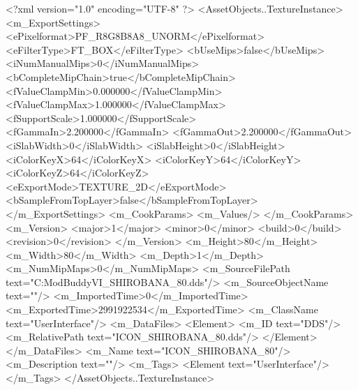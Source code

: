 <?xml version="1.0" encoding="UTF-8" ?>
<AssetObjects..TextureInstance>
	<m_ExportSettings>
		<ePixelformat>PF_R8G8B8A8_UNORM</ePixelformat>
		<eFilterType>FT_BOX</eFilterType>
		<bUseMips>false</bUseMips>
		<iNumManualMips>0</iNumManualMips>
		<bCompleteMipChain>true</bCompleteMipChain>
		<fValueClampMin>0.000000</fValueClampMin>
		<fValueClampMax>1.000000</fValueClampMax>
		<fSupportScale>1.000000</fSupportScale>
		<fGammaIn>2.200000</fGammaIn>
		<fGammaOut>2.200000</fGammaOut>
		<iSlabWidth>0</iSlabWidth>
		<iSlabHeight>0</iSlabHeight>
		<iColorKeyX>64</iColorKeyX>
		<iColorKeyY>64</iColorKeyY>
		<iColorKeyZ>64</iColorKeyZ>
		<eExportMode>TEXTURE_2D</eExportMode>
		<bSampleFromTopLayer>false</bSampleFromTopLayer>
	</m_ExportSettings>
	<m_CookParams>
		<m_Values/>
	</m_CookParams>
	<m_Version>
		<major>1</major>
		<minor>0</minor>
		<build>0</build>
		<revision>0</revision>
	</m_Version>
	<m_Height>80</m_Height>
	<m_Width>80</m_Width>
	<m_Depth>1</m_Depth>
	<m_NumMipMaps>0</m_NumMipMaps>
	<m_SourceFilePath text="C:\Users\asus\Documents\Firaxis ModBuddy\Civilization VI\temppic\ICON_SHIROBANA_80.dds"/>
	<m_SourceObjectName text=""/>
	<m_ImportedTime>0</m_ImportedTime>
	<m_ExportedTime>2991922534</m_ExportedTime>
	<m_ClassName text="UserInterface"/>
	<m_DataFiles>
		<Element>
			<m_ID text="DDS"/>
			<m_RelativePath text="ICON_SHIROBANA_80.dds"/>
		</Element>
	</m_DataFiles>
	<m_Name text="ICON_SHIROBANA_80"/>
	<m_Description text=""/>
	<m_Tags>
		<Element text="UserInterface"/>
	</m_Tags>
</AssetObjects..TextureInstance>

